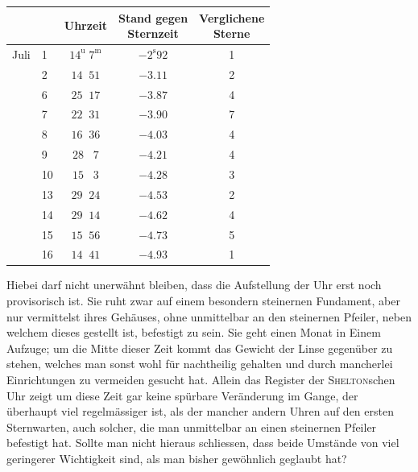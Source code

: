 \begin{center}
\begin{tabular}{ll|c|c|c}
 & & Uhrzeit & \shortstack{Stand gegen\\Sternzeit} & \shortstack{Verglichene\\Sterne} \\
\hline
Juli & 1 & $14^{\mathrm u}\;7^{\mathrm m}$ & $-2^{\mathrm s}92$ & 1 \\
 & 2 & $14\;\;51$ & $-3.11$ & 2 \\
 & 6 & $25\;\;17$ & $-3.87$ & 4 \\
 & 7 & $22\;\;31$ & $-3.90$ & 7 \\
 & 8 & $16\;\;36$ & $-4.03$ & 4 \\
 & 9 & $28\;\;\;7$ & $-4.21$ & 4 \\
 & 10 & $15\;\;\;3$ & $-4.28$ & 3 \\
 & 13 & $29\;\;24$ & $-4.53$ & 2 \\
 & 14 & $29\;\;14$ & $-4.62$ & 4 \\
 & 15 & $15\;\;56$ & $-4.73$ & 5 \\
 & 16 & $14\;\;41$ & $-4.93$ & 1 \\
\end{tabular}
\end{center}

\par\indent Hiebei darf nicht unerwähnt bleiben, dass die Aufstellung der Uhr erst noch provisorisch ist. Sie ruht zwar auf einem besondern steinernen Fundament, aber nur vermittelst ihres Gehäuses, ohne unmittelbar an den steinernen Pfeiler, neben welchem dieses gestellt ist, befestigt zu sein. Sie geht einen Monat in Einem Aufzuge; um die Mitte dieser Zeit kommt das Gewicht der Linse gegenüber zu stehen, welches man sonst wohl für nachtheilig gehalten und durch mancherlei Einrichtungen zu vermeiden gesucht hat. Allein das Register der \textsc{Shelton}schen Uhr zeigt um diese Zeit gar keine spürbare Veränderung im Gange, der überhaupt viel regelmässiger ist, als der mancher andern Uhren auf den ersten Sternwarten, auch solcher, die man unmittelbar an einen steinernen Pfeiler befestigt hat. Sollte man nicht hieraus schliessen, dass beide Umstände von viel geringerer Wichtigkeit sind, als man bisher gewöhnlich geglaubt hat?
